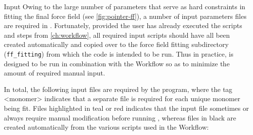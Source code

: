 \begin{subsection}{Input}
Owing to the large number of parameters that serve as hard constraints in
fitting the final \mastiff force field
(see \cref{fig:pointer-ff}), a number of input parameters files are required
in \pointer.
Fortunately, provided the user has already executed the scripts and steps
from
\cref{ch:workflow}, all required input scripts should have all been created
automatically and copied over to the force field fitting subdirectory
(\verb|ff_fitting|) from which the \pointer code is intended to be run.
Thus in practice, \pointer is designed to be run in combination with the
Workflow so as to minimize the amount of required manual input.

In total, the following input files are required by the \pointer program,
where the tag <monomer> indicates that a separate file is required for each
unique monomer being fit. Files highlighted in
\textcolor{codegreen}{teal} or \textcolor{codepurple}{red} indicates that the input file
sometimes or always require
manual modification before running \pointer, whereas files in black are
created automatically from the various scripts used in the Workflow:


\end{subsection}
